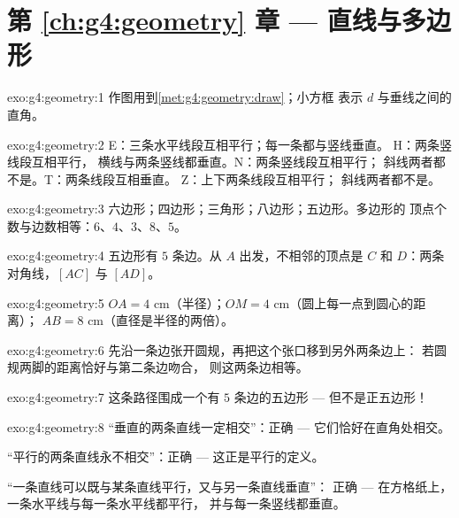 \section*{第 \ref{ch:g4:geometry} 章 --- 直线与多边形}

\begin{solution}{exo:g4:geometry:1}
作图用到\cref{met:g4:geometry:draw}；小方框
表示 $d$ 与垂线之间的直角。
\end{solution}

\begin{solution}{exo:g4:geometry:2}
E：三条水平线段互相平行；每一条都与竖线垂直。
H：两条竖线段互相平行，
横线与两条竖线都垂直。N：两条竖线段互相平行；
斜线两者都不是。T：两条线段互相垂直。
Z：上下两条线段互相平行；
斜线两者都不是。
\end{solution}

\begin{solution}{exo:g4:geometry:3}
六边形；四边形；三角形；八边形；五边形。多边形的
顶点个数与边数相等：$6$、$4$、$3$、$8$、$5$。
\end{solution}

\begin{solution}{exo:g4:geometry:4}
五边形有 $5$ 条边。从 $A$ 出发，不相邻的顶点是 $C$ 和
$D$：两条对角线，$[AC]$ 与 $[AD]$。
\end{solution}

\begin{solution}{exo:g4:geometry:5}
$OA = 4$ cm（半径）；$OM = 4$ cm（圆上每一点到圆心的距离）；
$AB = 8$ cm（直径是半径的两倍）。
\end{solution}

\begin{solution}{exo:g4:geometry:6}
先沿一条边张开圆规，再把这个张口移到另外两条边上：
若圆规两脚的距离恰好与第二条边吻合，
则这两条边相等。
\end{solution}

\begin{solution}{exo:g4:geometry:7}
这条路径围成一个有 $5$ 条边的五边形 ---
但不是正五边形！
\end{solution}

\begin{solution}{exo:g4:geometry:8}
“垂直的两条直线一定相交”：正确 ---
它们恰好在直角处相交。

“平行的两条直线永不相交”：正确 --- 这正是平行的定义。

“一条直线可以既与某条直线平行，又与另一条直线垂直”：
正确 --- 在方格纸上，一条水平线与每一条水平线都平行，
并与每一条竖线都垂直。
\end{solution}

